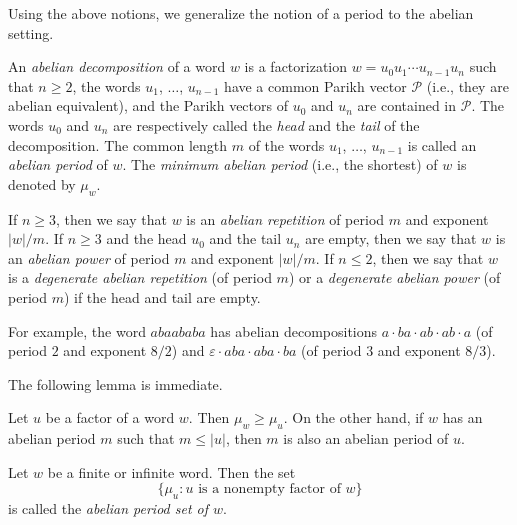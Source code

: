 \documentclass[a4paper,fleqn]{article}
\providecommand{\abs}[1]{\lvert#1\rvert}
\begin{document}
  Using the above notions, we generalize the notion of a period to the abelian setting.

  \begin{definition}\label{def:abelian_period}
    An \emph{abelian decomposition} of a word $w$ is a factorization $w = u_0 u_1 \dotsm u_{n-1} u_n$ such that
    $n \geq 2$, the words $u_1$, $\ldots$, $u_{n-1}$ have a common Parikh vector $\mathcal{P}$ (i.e., they are abelian
    equivalent), and the Parikh vectors of $u_0$ and $u_n$ are contained in $\mathcal{P}$. The words $u_0$ and $u_n$
    are respectively called the \emph{head} and the \emph{tail} of the decomposition. The common length $m$ of the
    words $u_1$, $\ldots$, $u_{n-1}$ is called an \emph{abelian period} of $w$. The \emph{minimum abelian period}
    (i.e., the shortest) of $w$ is denoted by $\mu_w$.

    If $n \geq 3$, then we say that $w$ is an \emph{abelian repetition} of period $m$ and exponent $\abs{w}/m$. If
    $n \geq 3$ and the head $u_0$ and the tail $u_n$ are empty, then we say that $w$ is an \emph{abelian power} of
    period $m$ and exponent $\abs{w}/m$. If $n \leq 2$, then we say that $w$ is a \emph{degenerate abelian repetition}
    (of period $m$) or a \emph{degenerate abelian power} (of period $m$) if the head and tail are empty.
  \end{definition}

  For example, the word $abaababa$ has abelian decompositions $a \cdot ba \cdot ab \cdot ab \cdot a$ (of period $2$ and
  exponent $8/2$) and $\varepsilon \cdot aba \cdot aba \cdot ba$ (of period $3$ and exponent $8/3$).

  The following lemma is immediate.

  \begin{lemma}\label{lem:abelian_period_covering}
    Let $u$ be a factor of a word $w$. Then $\mu_w \geq \mu_u$. On the other hand, if $w$ has an abelian period $m$
    such that $m \leq \abs{u}$, then $m$ is also an abelian period of $u$.
  \end{lemma}

  \begin{definition}
    Let $w$ be a finite or infinite word. Then the set
    \begin{equation*}
      \{\mu_u : \text{$u$ is a nonempty factor of $w$}\}
    \end{equation*}
    is called the \emph{abelian period set of $w$}.
  \end{definition}
\end{document}
